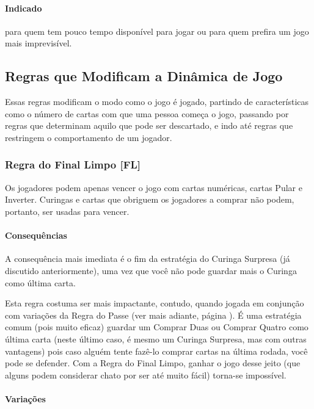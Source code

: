 \paragraph{Indicado}

para quem tem pouco tempo disponível para jogar ou para quem prefira um jogo mais imprevisível.

\subsection{Regras que Modificam a Dinâmica de Jogo}

Essas regras modificam o modo como o jogo é jogado, partindo de características como o número de cartas com que uma pessoa começa o jogo, passando por regras que determinam aquilo que pode ser descartado, e indo até regras que restringem o comportamento de um jogador.

\subsubsection{Regra do Final Limpo [FL]}

Os jogadores podem apenas vencer o jogo com cartas numéricas, cartas Pular e Inverter. Curingas e cartas que obriguem os jogadores a comprar não podem, portanto, ser usadas para vencer.

\paragraph{Consequências}

A consequência mais imediata é o fim da estratégia do Curinga Surpresa (já discutido anteriormente), uma vez que você não pode guardar mais o Curinga como última carta.

Esta regra costuma ser mais impactante, contudo, quando jogada em conjunção com variações da Regra do Passe (ver mais adiante, página \pageref{regradopasse}). É uma estratégia comum (pois muito eficaz) guardar um Comprar Duas ou Comprar Quatro como última carta (neste último caso, é mesmo um Curinga Surpresa, mas com outras vantagens) pois caso alguém tente fazê-lo comprar cartas na última rodada, você pode se defender. Com a Regra do Final Limpo, ganhar o jogo desse jeito (que alguns podem considerar chato por ser até muito fácil) torna-se impossível.

\paragraph{Variações}

